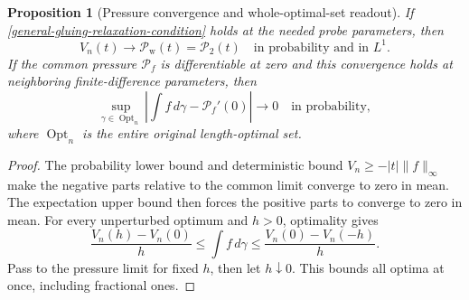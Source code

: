 \documentclass[11pt,reqno]{amsart}
\newtheorem{proposition}[theorem]{Proposition}
\theoremstyle{definition}
\theoremstyle{remark}
\numberwithin{equation}{section}
\begin{document}
\begin{proposition}[Pressure convergence and whole-optimal-set readout]
\label{general-gluing-conditional-readout}
If \eqref{general-gluing-relaxation-condition} holds at the needed probe
parameters, then
\[
 V_n(t)\longrightarrow\mathcal P_{\mathrm w}(t)=\mathcal P_2(t)
               \quad\text{in probability and in }L^1.
\]
If the common pressure \(\mathcal P_f\) is differentiable at zero and
this convergence holds at neighboring finite-difference parameters, then
\begin{equation}
\label{general-gluing-all-optimal-readout}
 \sup_{\gamma\in\operatorname{Opt}_n}
     \left|\int f\,d\gamma-\mathcal P_f'(0)\right|
               \longrightarrow0\quad\text{in probability},
\end{equation}
where \(\operatorname{Opt}_n\) is the entire original length-optimal set.
\end{proposition}

\begin{proof}
The probability lower bound and deterministic bound
\(V_n\ge-|t|\|f\|_\infty\) make the negative parts relative to the
common limit converge to zero in mean. The expectation upper bound then
forces the positive parts to converge to zero in mean. For every
unperturbed optimum and \(h>0\), optimality gives
\[
 \frac{V_n(h)-V_n(0)}h
 \le\int f\,d\gamma
 \le\frac{V_n(0)-V_n(-h)}h.
\]
Pass to the pressure limit for fixed \(h\), then let \(h\downarrow0\).
This bounds all optima at once, including fractional ones.
\end{proof}
\end{document}
